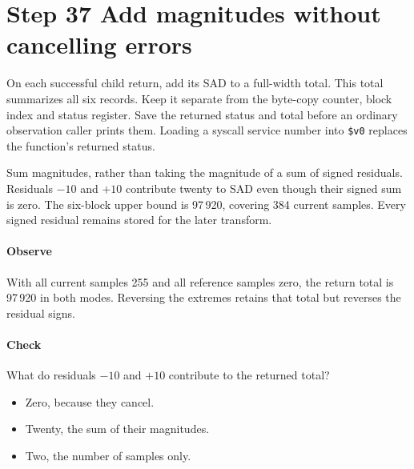 \section{Step 37 Add magnitudes without cancelling errors}\label{h263-macroblock-s07}
On each successful child return, add its SAD to a full-width total. This total
summarizes all six records. Keep it separate from the byte-copy counter, block
index and status register. Save the returned status and total before an
ordinary observation caller prints them. Loading a syscall service number into
\texttt{\$v0} replaces the function's returned status.

Sum magnitudes, rather than taking the magnitude of a sum of signed residuals.
Residuals $-10$ and $+10$ contribute twenty to SAD even though their signed sum
is zero. The six-block upper bound is 97\,920, covering 384 current samples.
Every signed residual remains stored for the later transform.

\paragraph{Observe} With all current samples 255 and all reference samples zero,
the return total is 97\,920 in both modes. Reversing the extremes retains that
total but reverses the residual signs.
\paragraph{Check} What do residuals $-10$ and $+10$ contribute to the returned total?
\begin{itemize}
  \item[A.] Zero, because they cancel.
  \item[B.] Twenty, the sum of their magnitudes.
  \item[C.] Two, the number of samples only.
\end{itemize}
